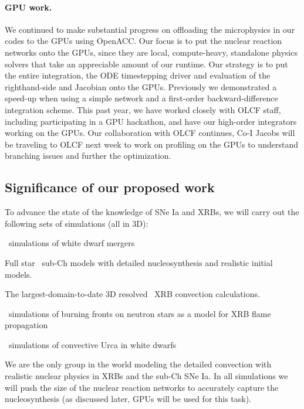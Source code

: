 \documentclass[11pt,letterpaper,english]{article}
\begin{document}
\paragraph{GPU work.}
%
We continued to make substantial progress on offloading the
microphysics in our codes to the GPUs using OpenACC.  Our focus is to
put the nuclear reaction networks onto the GPUs, since they are local,
compute-heavy, standalone physics solvers that take an appreciable
amount of our runtime. Our strategy is to put the entire integration,
the ODE timestepping driver and evaluation of the righthand-side and
Jacobian onto the GPUs.  Previously we demonstrated a speed-up when
using a simple network and a first-order backward-difference
integration scheme.  This past year, we have worked closely with OLCF
staff, including participating in a GPU hackathon, and have our
high-order integrators working on the GPUs.  Our collaboration
with OLCF continues, Co-I Jacobs will be traveling to OLCF next week
to work on profiling on the GPUs to understand branching issues and
further the optimization.




\subsection{Significance of our proposed work}

To advance the state of the knowledge of SNe Ia and XRBs, we will
carry out the following sets of simulations (all in 3D):
\begin{tightitem}
\item \castro\ simulations of white dwarf mergers
\item Full star \maestro\ sub-Ch models with 
  detailed nucleosynthesis and realistic initial models.
\item The largest-domain-to-date 3D resolved \maestro\ XRB convection
  calculations.
\item \castro\ simulations of burning fronts on neutron stars
  as a model for XRB flame propagation
\item \maestro\ simulations of convective Urca in white dwarfs
\end{tightitem}

We are the only group in the world modeling the detailed convection
with realistic nuclear physics in XRBs and the sub-Ch SNe Ia.
In all simulations we will push the size of the nuclear reaction networks
to accurately capture the nucleosynthesis (as discussed later, GPUs will
be used for this task).
\end{document}
